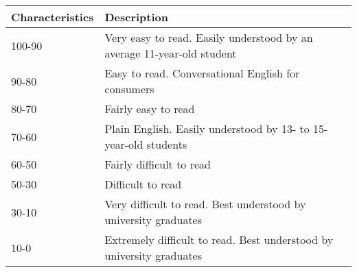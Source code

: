 \begin{tabular}{|l|p{90mm}|} \hline
\textbf{Characteristics} & \textbf{Description} \\ \hline
100-90 & Very easy to read. Easily understood by an average 11-year-old student \\ \hline
90-80 & Easy to read. Conversational English for consumers \\ \hline
80-70 & Fairly easy to read \\ \hline
70-60 & Plain English. Easily understood by 13- to 15-year-old students \\ \hline
60-50 & Fairly difficult to read \\ \hline
50-30 & Difficult to read \\ \hline
30-10 & Very difficult to read. Best understood by university graduates \\ \hline
10-0 & Extremely difficult to read. Best understood by university graduates \\ \hline
\end{tabular}